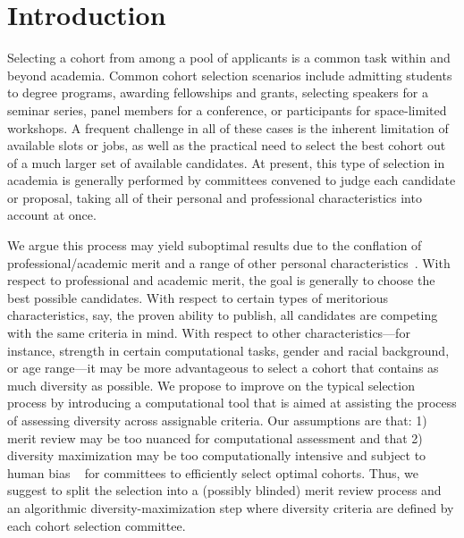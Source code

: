 \documentclass[12pt]{article}
\begin{document}
\maketitle{}


\section*{\label{sec:introduction}Introduction}

Selecting a cohort from among a pool of applicants is a common task within and beyond academia. Common cohort selection scenarios include admitting students to degree programs, awarding fellowships and grants, selecting speakers for a seminar series, panel members for a conference, or participants for space-limited workshops. A frequent challenge in all of these cases is the inherent limitation of available slots or jobs, as well as the practical need to select the best cohort out of a much larger set of available candidates. At present, this type of selection in academia is generally performed by committees convened to judge each candidate or proposal, taking all of their personal and professional characteristics into account at once. 

We argue this process may yield suboptimal results due to the conflation of professional/academic merit and a range of other personal characteristics~\cite{bohnet2016}. With respect to professional and academic merit, the goal is generally to choose the best possible candidates. With respect to certain types of meritorious characteristics, say, the proven ability to publish, all candidates are competing with the same criteria in mind. With respect to other characteristics---for instance, strength in certain computational tasks, gender and racial background, or age range---it may be more advantageous to select a cohort that contains as much diversity as possible. We propose to improve on the typical selection process by introducing a computational tool that is aimed at assisting the process of assessing diversity across assignable criteria. Our assumptions are that: 1) merit review may be too nuanced for computational assessment and that 2) diversity maximization may be too computationally intensive and subject to human bias ~\cite{Greenwald1995} for committees to efficiently select optimal cohorts. Thus, we suggest to split the selection into a (possibly blinded) merit review process and an algorithmic diversity-maximization step where diversity criteria are defined by each cohort selection committee.
\end{document}
